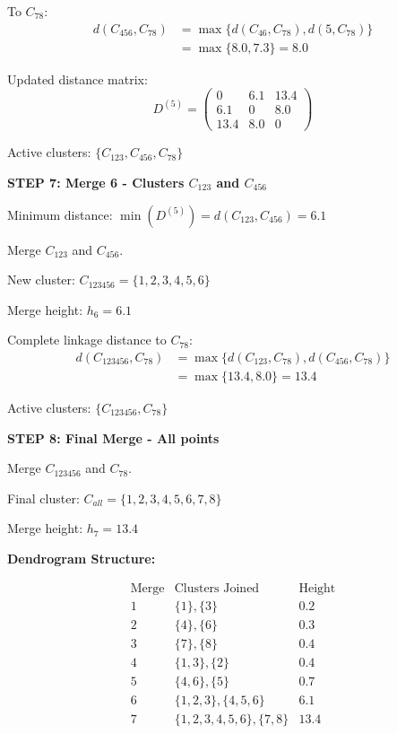 \documentclass[12pt]{article}
\begin{document}
\begin{solution}
To $C_{78}$:
\begin{align*}
d(C_{456}, C_{78}) &= \max\{d(C_{46}, C_{78}), d(5, C_{78})\} \\
&= \max\{8.0, 7.3\} = 8.0
\end{align*}

Updated distance matrix:
\[
D^{(5)} = \begin{pmatrix}
0 & 6.1 & 13.4 \\
6.1 & 0 & 8.0 \\
13.4 & 8.0 & 0
\end{pmatrix}
\]

Active clusters: $\{C_{123}, C_{456}, C_{78}\}$

\textbf{STEP 7: Merge 6 - Clusters $C_{123}$ and $C_{456}$}

Minimum distance: $\min(D^{(5)}) = d(C_{123}, C_{456}) = 6.1$

Merge $C_{123}$ and $C_{456}$.

New cluster: $C_{123456} = \{1, 2, 3, 4, 5, 6\}$

Merge height: $h_6 = 6.1$

Complete linkage distance to $C_{78}$:
\begin{align*}
d(C_{123456}, C_{78}) &= \max\{d(C_{123}, C_{78}), d(C_{456}, C_{78})\} \\
&= \max\{13.4, 8.0\} = 13.4
\end{align*}

Active clusters: $\{C_{123456}, C_{78}\}$

\textbf{STEP 8: Final Merge - All points}

Merge $C_{123456}$ and $C_{78}$.

Final cluster: $C_{all} = \{1, 2, 3, 4, 5, 6, 7, 8\}$

Merge height: $h_7 = 13.4$

\textbf{Dendrogram Structure:}

\[
\boxed{
\begin{array}{c|c|c}
\text{Merge} & \text{Clusters Joined} & \text{Height} \\
\hline
1 & \{1\}, \{3\} & 0.2 \\
2 & \{4\}, \{6\} & 0.3 \\
3 & \{7\}, \{8\} & 0.4 \\
4 & \{1,3\}, \{2\} & 0.4 \\
5 & \{4,6\}, \{5\} & 0.7 \\
6 & \{1,2,3\}, \{4,5,6\} & 6.1 \\
7 & \{1,2,3,4,5,6\}, \{7,8\} & 13.4
\end{array}
}
\]


\end{solution}
\end{document}
